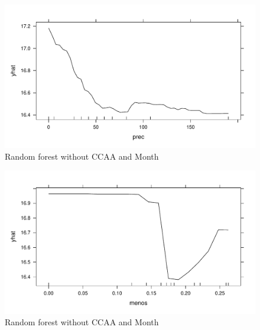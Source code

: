 \documentclass[
]{report}
\begin{document}
\begin{figure}

{\centering \includegraphics{Modelling_Energy_Intensity-V3_files/figure-pdf/unnamed-chunk-6-3.pdf}

}

\caption{Random forest without CCAA and Month}

\end{figure}

\begin{figure}

{\centering \includegraphics{Modelling_Energy_Intensity-V3_files/figure-pdf/unnamed-chunk-6-4.pdf}

}

\caption{Random forest without CCAA and Month}

\end{figure}
\end{document}
